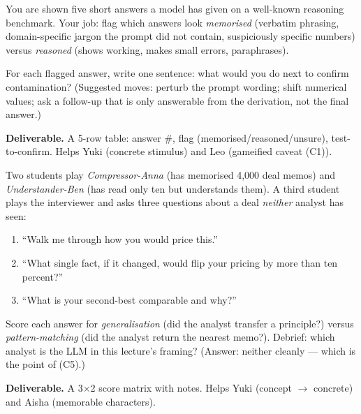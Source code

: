 \documentclass[12pt,a4paper]{article}
\theoremstyle{plain}
\theoremstyle{definition}
\begin{document}
\begin{activity}[title={Activity 8.2 --- Benchmark-contamination detective}]
You are shown five short answers a model has given on a well-known
reasoning benchmark. Your job: flag which answers look
\emph{memorised} (verbatim phrasing, domain-specific jargon the
prompt did not contain, suspiciously specific numbers) versus
\emph{reasoned} (shows working, makes small errors, paraphrases).

For each flagged answer, write one sentence: what would you do next
to confirm contamination? (Suggested moves: perturb the prompt
wording; shift numerical values; ask a follow-up that is only
answerable from the derivation, not the final answer.)

\textbf{Deliverable.} A 5-row table: answer \#, flag
(memorised/reasoned/unsure), test-to-confirm. Helps Yuki (concrete
stimulus) and Leo (gameified caveat (C1)).
\end{activity}

\begin{activity}[title={Activity 8.3 --- Two-analyst roleplay}]
Two students play \emph{Compressor-Anna} (has memorised 4{,}000 deal
memos) and \emph{Understander-Ben} (has read only ten but understands
them). A third student plays the interviewer and asks three
questions about a deal \emph{neither} analyst has seen:

\begin{enumerate}[leftmargin=1.4em,itemsep=2pt]
  \item ``Walk me through how you would price this.''
  \item ``What single fact, if it changed, would flip your pricing
        by more than ten percent?''
  \item ``What is your second-best comparable and why?''
\end{enumerate}

Score each answer for \emph{generalisation} (did the analyst
transfer a principle?) versus \emph{pattern-matching} (did the
analyst return the nearest memo?). Debrief: which analyst is the
LLM in this lecture's framing? (Answer: neither cleanly --- which
is the point of (C5).)

\textbf{Deliverable.} A 3$\times$2 score matrix with notes. Helps
Yuki (concept $\to$ concrete) and Aisha (memorable characters).
\end{activity}
\end{document}
